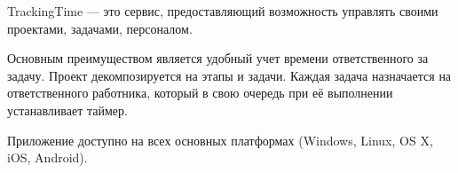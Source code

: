 
TrackingTime --- это сервис, предоставляющий возможность управлять своими проектами, задачами, персоналом.

Основным преимуществом является удобный учет времени ответственного за задачу. 
Проект декомпозируется на этапы и задачи.
Каждая задача назначается на ответственного работника, который в свою очередь при её выполнении устанавливает таймер.

Приложение доступно на всех основных платформах (Windows, Linux, OS X, iOS, Android).
